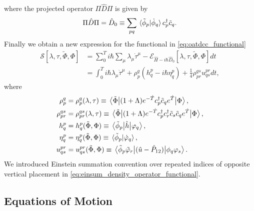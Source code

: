 where the projected operator $\Pi\hat{D}\Pi$ is given by 
\begin{equation}
    \Pi\hat{D}\Pi = \hat{D}_0 
    \equiv 
    \sum_{pq}\braket*{\tilde{\phi}_p}{\dot{\phi}_q}c^\dagger_p \tilde{c}_q.
\end{equation}
Finally we obtain a new expression for the functional in \autoref{eq:oatdcc_functional}
\begin{align}
    \label{eq:oatdcc_functional_final}
    \mathcal{S}[\lambda, \tau, \tilde{\Phi}, \Phi] 
    &= \sum_0^T 
    i\hbar\sum_\mu \lambda_\mu \dot{\tau}^\mu 
    - \mathcal{E}_{\hat{H} - i \hbar\hat{D}_0}[\lambda, \tau, \tilde{\Phi}, \Phi] dt \\
    \label{eq:einsum_density_operator_functional}  
    &= \int_0^T i\hbar \lambda_\mu \dot{\tau}^\mu 
    + \rho^q_p (h^p_q - i\hbar\eta^p_q) + \frac{1}{4}\rho^{qs}_{pr} u^{pr}_{qs}dt,
\end{align}
where
\begin{align} 
    \rho^q_p &= \rho^q_p(\lambda, \tau) 
    \equiv \mel{\tilde{\Phi}}
    {(1 + \Lambda)e^{-\hat{T}}c^\dagger_p \tilde{c}_q e^{\hat{T}}}
    {\Phi}, \\
    \rho^{qs}_{pr} &= \rho^{qs}_{pr}(\lambda, \tau) 
    \equiv \mel{\tilde{\Phi}}
    {(1 + \Lambda)e^{-\hat{T}} c^\dagger_p c^\dagger_r \tilde{c}_s \tilde{c}_q e^{\hat{T}}}
    {\Phi}, \\
    h^p_q &= h^p_q(\tilde{\Phi}, \Phi)
    \equiv \mel{\tilde{\phi}_p}{\hat{h}}{\varphi_q}, \\
    \eta^p_q &= \eta^p_q(\tilde{\Phi}, \Phi)
    \equiv \braket*{\tilde{\phi}_p}{\dot{\varphi}_q}, \\
    u^{pr}_{qs} &= u^{pr}_{qs}(\tilde{\Phi}, \Phi)
    \equiv \mel{\tilde{\phi}_p\tilde{\varphi}_r}
    {(\hat{u} - \hat{P}_{12})}
    {\phi_q \varphi_s}.
\end{align}
We introduced Einstein summation convention over repeated indices of opposite vertical 
placement in \autoref{eq:einsum_density_operator_functional}.

\subsection{Equations of Motion}


